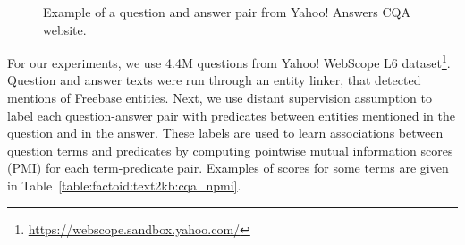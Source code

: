 \begin{figure}[t]
\centering
{}
\caption{Example of a question and answer pair from Yahoo! Answers CQA website.}
\label{figure:factoid:text2kb:cqa_example}
\end{figure}

For our experiments, we use 4.4M questions from Yahoo! WebScope L6 dataset\footnote{\href{url}{https://webscope.sandbox.yahoo.com/}}.
Question and answer texts were run through an entity linker, that detected mentions of Freebase entities.
Next, we use distant supervision assumption to label each question-answer pair with predicates between entities mentioned in the question and in the answer.
These labels are used to learn associations between question terms and predicates by computing pointwise mutual information scores (PMI) for each term-predicate pair.
Examples of scores for some terms are given in Table~\ref{table:factoid:text2kb:cqa_npmi}.

